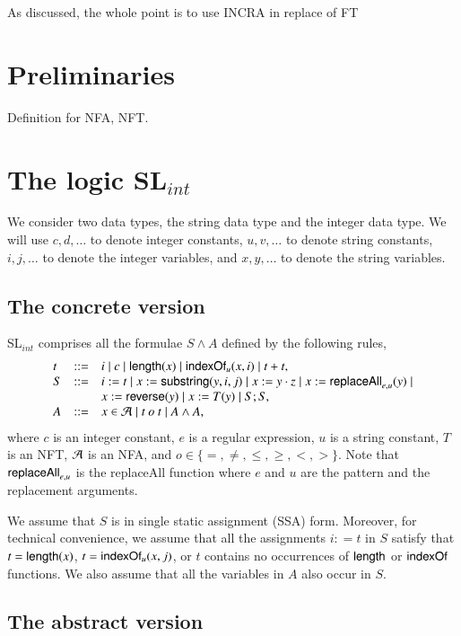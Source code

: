 \documentclass[sigplan,review,anonymous]{acmart}\settopmatter{printfolios=true,printccs=false,printacmref=false}
\begin{document}
As discussed, the whole point is to use INCRA in replace of FT 

\section{Preliminaries}
\label{prel}

Definition for NFA, NFT.

\section{The logic SL$_{int}$}

We consider two data types, the string data type and the integer data type. We will use $c, d,\dots$ to denote integer constants, $u, v, \dots$ to denote string constants,  $i, j, \dots$ to denote the  integer variables, and $x, y, \dots$ to denote the string variables.

\subsection{The concrete version}

SL$_{int}$ comprises all the formulae $S \wedge A$ defined by the following rules,
\[
\begin{array}{l c l}
t  &::=& i \mid c \mid \mathsf{length}(x) \mid \mathsf{indexOf}_u(x, i) \mid t + t,   \\
S &::= & i:= t \mid x := \mathsf{substring}(y, i, j)  \mid x:= y \cdot z \mid x:= \mathsf{replaceAll}_{e,u}(y) \mid\\
&&  x:=\mathsf{reverse}(y) \mid x:=T(y) \mid S;S, \\
A & ::= &   x \in \mathcal{A} \mid t\ o\ t \mid A \wedge A,
\end{array}
\]
where $c$ is an integer constant, $e$ is a regular expression,  $u$ is a string constant, $T$ is an NFT, $\mathcal{A}$ is an NFA, and $o \in \{=, \neq, \le, \ge, <, >\}$.
Note that $\mathsf{replaceAll}_{e,u}$ is the replaceAll function where $e$ and $u$ are the pattern and the replacement arguments.



We assume that $S$ is in single static assignment (SSA) form. Moreover, for technical convenience, we assume that all the assignments $i: = t$ in $S$ satisfy that $t= \mathsf{length}(x)$, $t=\mathsf{indexOf}_u(x, j)$, or $t$ contains no occurrences of $\mathsf{length}$ or $\mathsf{indexOf}$ functions. We also assume that all the variables in $A$ also occur in $S$. 



\subsection{The abstract version}
\end{document}
